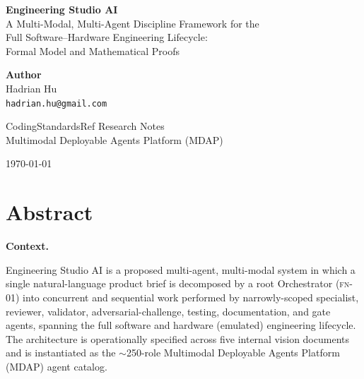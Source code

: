 \documentclass[12pt]{article}
\theoremstyle{definition}
\newcommand{\FN}[1]{\textsc{fn-#1}}
\begin{document}
\begin{titlepage}
    \centering
    \vspace*{1cm}
    {\LARGE \textbf{Engineering Studio AI}}\\[0.3cm]
    {\large A Multi-Modal, Multi-Agent Discipline Framework for the}\\
    {\large Full Software--Hardware Engineering Lifecycle:}\\
    {\large Formal Model and Mathematical Proofs}

    \vspace{2cm}

    {\large \textbf{Author}}\\
    Hadrian Hu\\
    \texttt{hadrian.hu@gmail.com}

    \vspace{1cm}

    {\large CodingStandardsRef Research Notes}\\
    Multimodal Deployable Agents Platform (MDAP)

    \vspace{2cm}

    {\large \today}

    \vfill
\end{titlepage}

\newpage
\section*{Abstract}

\noindent
\textbf{Context.}

Engineering Studio AI is a proposed multi-agent, multi-modal system
in which a single natural-language product brief is decomposed by a
root Orchestrator (\FN{01}) into concurrent and sequential work
performed by narrowly-scoped specialist, reviewer, validator,
adversarial-challenge, testing, documentation, and gate agents,
spanning the full software and hardware (emulated) engineering
lifecycle.
The architecture is operationally specified across five internal
vision documents and is instantiated as the $\sim$250-role
Multimodal Deployable Agents Platform (MDAP) agent catalog.
\end{document}
